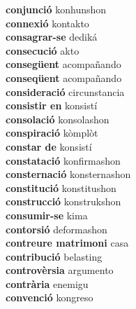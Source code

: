 \textbf{ conjunció  } konhunshon \\
\textbf{ connexió  } kontakto \\
\textbf{ consagrar-se  } dediká \\
\textbf{ consecució  } akto \\
\textbf{ consegüent  } acompañando \\
\textbf{ conseqüent  } acompañando \\
\textbf{ consideració  } circunstancia \\
\textbf{ consistir en  } konsistí \\
\textbf{ consolació  } konsolashon \\
\textbf{ conspiració  } kòmplòt \\
\textbf{ constar de  } konsistí \\
\textbf{ constatació  } konfirmashon \\
\textbf{ consternació  } konsternashon \\
\textbf{ constitució  } konstitushon \\
\textbf{ construcció  } konstrukshon \\
\textbf{ consumir-se  } kima \\
\textbf{ contorsió  } deformashon \\
\textbf{ contreure matrimoni  } casa \\
\textbf{ contribució  } belasting \\
\textbf{ controvèrsia  } argumento \\
\textbf{ contrària  } enemigu \\
\textbf{ convenció  } kongreso \\
